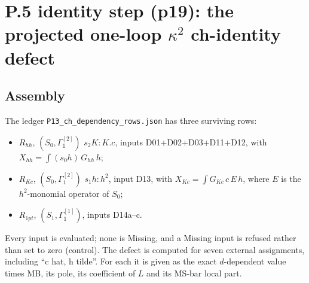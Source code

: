 \section{P.5 identity step (p19): the projected one-loop $\kappa^2$ ch-identity defect}

\subsection{Assembly}
The ledger \texttt{P13\_ch\_dependency\_rows.json} has three surviving rows:
\begin{itemize}
\item $R_{hh}$, $(S_0,\Gamma_1^{[2]})$ $s_2K{:}K.c$, inputs D01+D02+D03+D11+D12, with
  $X_{hh}=\int(s_0h)\,G_{hh}\,h$;
\item $R_{Kc}$, $(S_0,\Gamma_1^{[2]})$ $s_1h{:}h^2$, input D13, with $X_{Kc}=\int G_{Kc}\,c\,E\,h$, where $E$ is
  the $h^2$-monomial operator of $S_0$;
\item $R_{1pt}$, $(S_1,\Gamma_1^{[1]})$, inputs D14a--c.
\end{itemize}
Every input is evaluated; none is Missing, and a Missing input is refused rather than set to zero (control). The
defect is computed for seven external assignments, including ``c hat, h tilde''. For each it is given as the exact
$d$-dependent value times MB, its pole, its coefficient of $L$ and its MS-bar local part.

